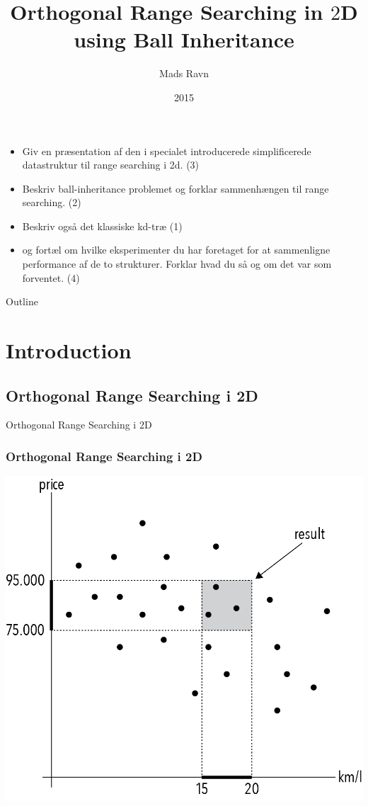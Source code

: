 \documentclass[pdf]{beamer}
\title{Orthogonal Range Searching in $2$D\\ using Ball Inheritance}
\author{Mads Ravn}
\institute{Computer Science, Aarhus University}
\date{2015}
\begin{document}
\begin{frame}
  \titlepage
\end{frame}

\begin{frame}
  \begin{itemize}
    \item Giv en præsentation af den i specialet introducerede simplificerede datastruktur til range searching i 2d. (3)
    \item Beskriv ball-inheritance problemet og forklar sammenhængen til range searching. (2)
    \item Beskriv også det klassiske kd-træ (1)
    \item og fortæl om hvilke eksperimenter du har foretaget for at sammenligne performance af de to strukturer. Forklar hvad du så og om det var som forventet. (4)
  \end{itemize}
\end{frame}

\begin{frame}{Outline}
  \tableofcontents
\end{frame}

\section{Introduction}
\subsection{Orthogonal Range Searching i 2D}

\begin{frame}{Orthogonal Range Searching i 2D}
  \frametitle{Orthogonal Range Searching i 2D}
    \begin{center}
      \includegraphics[scale=0.8]{pictures/introduction.png}
    \end{center}

\end{frame}
\end{document}
